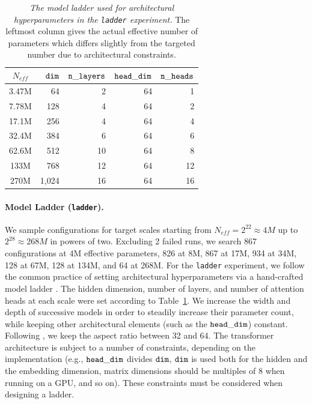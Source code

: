 \begin{table}
    \centering
    \begin{tabular}{c|rrrr}
        \toprule
          $N_{eff}$ & $\mathtt{dim}$ & $\mathtt{n\_layers}$ & $\mathtt{head\_dim}$ & $\mathtt{n\_heads}$ \\
        \midrule
              3.47M &             64 &                    2 &                   64 &                   1 \\
              7.78M &            128 &                    4 &                   64 &                   2 \\
              17.1M &            256 &                    4 &                   64 &                   4 \\
              32.4M &            384 &                    6 &                   64 &                   6 \\
              62.6M &            512 &                   10 &                   64 &                   8 \\
               133M &            768 &                   12 &                   64 &                  12 \\
               270M &          1,024 &                   16 &                   64 &                  16 \\
        \bottomrule
    \end{tabular}
    \caption{
        \emph{The model ladder used for architectural hyperparameters in the \texttt{ladder} experiment.} The leftmost column gives the actual effective number of parameters which differs slightly from the targeted number due to architectural constraints.
    }
    \label{tab:model-ladder}
\end{table}

\paragraph{Model Ladder (\texttt{ladder}).} We sample configurations for target scales starting from $N_{eff} = 2^{22} \approx 4M$ up to $2^{28} \approx 268M$ in powers of two. Excluding 2 failed runs, we search 867 configurations at 4M effective parameters, 826 at 8M, 867 at 17M, 934 at 34M, 128 at 67M, 128 at 134M, and 64 at 268M. For the \texttt{ladder} experiment, we follow the common practice of setting architectural hyperparameters via a hand-crafted model ladder \citep{Hagele2024ScalingLaws, bhagia2025establishing}. The hidden dimension, number of layers, and number of attention heads at each scale were set according to Table~\ref{tab:model-ladder}. We increase the width and depth of successive models in order to steadily increase their parameter count, while keeping other architectural elements (such as the $\mathtt{head\_dim}$) constant. Following \citet{Porian2024Resolving}, we keep the aspect ratio between 32 and 64. The transformer architecture is subject to a number of constraints, depending on the implementation (e.g., $\mathtt{head\_dim}$ divides $\mathtt{dim}$, $\mathtt{dim}$ is used both for the hidden and the embedding dimension, matrix dimensions should be multiples of 8 when running on a GPU, and so on). These constraints must be considered when designing a ladder.

